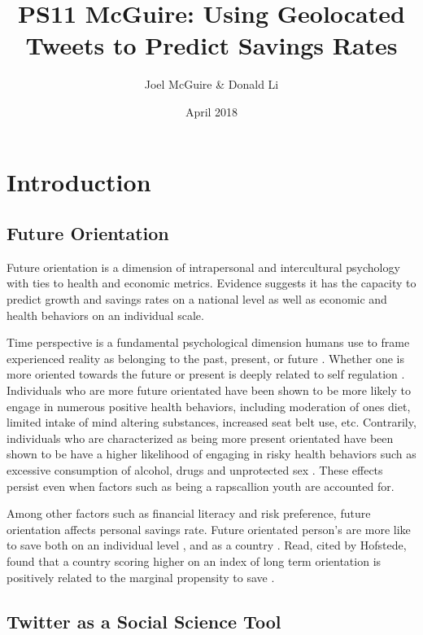 \documentclass{article}
\title{PS11 McGuire: Using Geolocated Tweets to Predict Savings Rates}
\author{Joel McGuire & Donald Li}
\date{April 2018}
\begin{document}
\maketitle


\section{Introduction}

\subsection{Future Orientation}

Future orientation is a dimension of intrapersonal and intercultural psychology with ties to health and economic metrics. Evidence suggests it has the capacity to predict growth and savings rates on a national level as well as economic and health behaviors on an individual scale.

Time perspective is a fundamental psychological dimension humans use to frame experienced reality as belonging to the past, present, or future \cite{zimbardo2015putting}. Whether one is more oriented towards the future or present is deeply related to self regulation \cite{howlett2008role}. Individuals who are more future orientated have been shown to be more likely to engage in numerous positive health behaviors, including moderation of ones diet, limited intake of mind altering substances, increased seat belt use, etc. Contrarily, individuals who are characterized as being more present orientated have been shown to be have a higher likelihood of engaging in risky health behaviors such as excessive consumption of alcohol, drugs and unprotected sex \cite{henson2006associations, daugherty2010taking}. These effects persist even when factors such as being a rapscallion youth are accounted for. 

Among other factors such as financial literacy and risk preference, future orientation affects personal savings rate. Future orientated person's are more like to save both on an individual level \cite{jacobs2005influence}, and as a country \cite{hofstede1988confucius, hofstede1991cultures}. Read, cited by Hofstede, found that a country scoring higher on an index of long term orientation is positively related to the marginal propensity to save \cite{read1993politics}.

\subsection{Twitter as a Social Science Tool}
\end{document}
